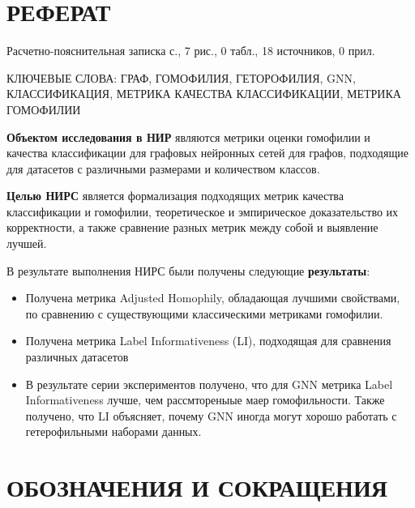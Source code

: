 \documentclass[a4paper,14pt]{article}
\begin{document}
    
    
    \section*{\hfill РЕФЕРАТ \hfill}
    
    Расчетно-пояснительная записка \pageref{LastPage} с., 7 рис., 0 табл., 18 источников, 0 прил.
    
    КЛЮЧЕВЫЕ СЛОВА: ГРАФ, ГОМОФИЛИЯ, ГЕТОРОФИЛИЯ, GNN, КЛАССИФИКАЦИЯ, МЕТРИКА КАЧЕСТВА КЛАССИФИКАЦИИ, МЕТРИКА ГОМОФИЛИИ 
    
    \textbf{Объектом исследования в  НИР} являются метрики оценки гомофилии и качества классификации для графовых нейронных сетей для графов, подходящие для датасетов с различными размерами и количеством классов.
    
    \textbf{Целью НИРС} является формализация подходящих метрик качества классификации и гомофилии, теоретическое и эмпирическое доказательство их корректности, а также сравнение разных метрик между собой и выявление лучшей. 
    
    
    В результате выполнения НИРС были получены следующие \textbf{результаты}:
    
    \begin{itemize}
    	\item Получена метрика Adjusted Homophily, обладающая лучшими свойствами, по сравнению с существующими классическими метриками гомофилии. 
    
    	\item Получена метрика Label Informativeness (LI), подходящая для сравнения различных датасетов 
    
    	\item В результате серии экспериментов получено, что  для  GNN метрика Label Informativeness лучше, чем рассмтореныые маер гомофильности.
    	Также получено, что LI объясняет, почему GNN иногда могут хорошо работать с гетерофильными наборами данных.
\end{itemize}

  
    \newpage
    
    \tableofcontents
    \pagebreak
    
    \newpage
    
	\section*{ \hfill ОБОЗНАЧЕНИЯ И СОКРАЩЕНИЯ \hfill}
	
\end{document}
